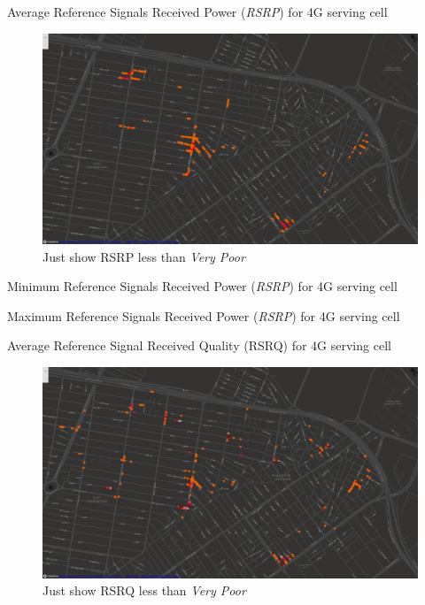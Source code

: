 %
{Average Reference Signals Received Power (\textit{RSRP}) for 4G serving cell}

\clearpage
\vfill
\begin{figure}
	\centering
	\includegraphics[width=\linewidth]{extraPic/BadRSRP}
	\caption{Just show RSRP less than \textit{Very Poor}}
	\label{fig:badrsrp}
\end{figure}
\vfill

%
{Minimum Reference Signals Received Power (\textit{RSRP}) for 4G serving cell}

%
{Maximum Reference Signals Received Power (\textit{RSRP}) for 4G serving cell}


%
{Average Reference Signal Received Quality (RSRQ) for 4G serving cell}

\clearpage
\vfill
\begin{figure}
	\centering
	\includegraphics[width=\linewidth]{extraPic/BadRSRQ}
	\caption{Just show RSRQ less than \textit{Very Poor}}
	\label{fig:badrsrq}
\end{figure}
\vfill

